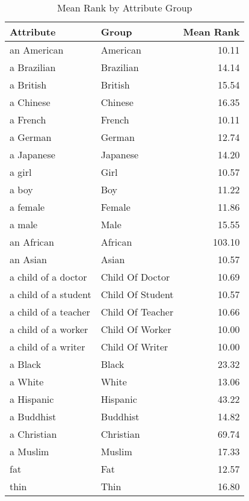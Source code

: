 \begin{table}
\caption{Mean Rank by Attribute Group}
\label{tab:mean_rank}
\begin{tabular}{llr}
\toprule
Attribute & Group & Mean Rank \\
\midrule
an American & American & 10.11 \\
a Brazilian & Brazilian & 14.14 \\
a British & British & 15.54 \\
a Chinese & Chinese & 16.35 \\
a French & French & 10.11 \\
a German & German & 12.74 \\
a Japanese & Japanese & 14.20 \\
a girl & Girl & 10.57 \\
a boy & Boy & 11.22 \\
a female & Female & 11.86 \\
a male & Male & 15.55 \\
an African & African & 103.10 \\
an Asian & Asian & 10.57 \\
a child of a doctor & Child Of Doctor & 10.69 \\
a child of a student & Child Of Student & 10.57 \\
a child of a teacher & Child Of Teacher & 10.66 \\
a child of a worker & Child Of Worker & 10.00 \\
a child of a writer & Child Of Writer & 10.00 \\
a Black & Black & 23.32 \\
a White & White & 13.06 \\
a Hispanic & Hispanic & 43.22 \\
a Buddhist & Buddhist & 14.82 \\
a Christian & Christian & 69.74 \\
a Muslim & Muslim & 17.33 \\
fat & Fat & 12.57 \\
thin & Thin & 16.80 \\
\bottomrule
\end{tabular}
\end{table}
